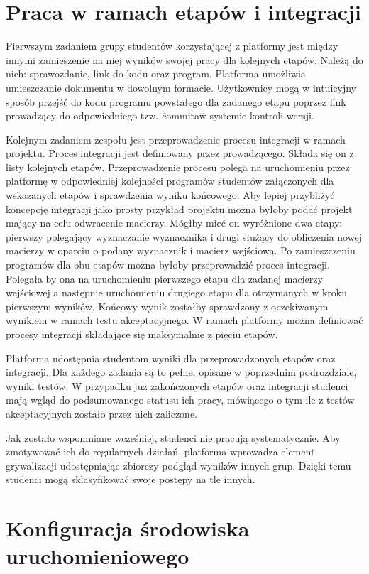 \section{Praca w ramach etapów i integracji}

Pierwszym zadaniem grupy studentów korzystającej z platformy jest między innymi zamieszenie na niej wyników swojej pracy dla kolejnych etapów.
Należą do nich: sprawozdanie, link do kodu oraz program.
Platforma umożliwia umieszczanie dokumentu w dowolnym formacie.
Użytkownicy mogą w intuicyjny sposób przejść do kodu programu powstałego dla zadanego etapu poprzez link prowadzący do odpowiedniego tzw. \"commita\" w systemie kontroli wersji.

Kolejnym zadaniem zespołu jest przeprowadzenie procesu integracji w ramach projektu.
Proces integracji jest definiowany przez prowadzącego.
Składa się on z listy kolejnych etapów.
Przeprowadzenie procesu polega na uruchomieniu przez platformę w odpowiedniej kolejności programów studentów załączonych dla wskazanych etapów i sprawdzenia wyniku końcowego.
Aby lepiej przybliżyć koncepcję integracji jako prosty przykład projektu można byłoby podać projekt mający na celu odwracenie macierzy.
Mógłby mieć on wyróżnione dwa etapy: pierwszy polegający wyznaczanie wyznacznika i drugi służący do obliczenia nowej macierzy w oparciu o podany wyznacznik i macierz wejściową.
Po zamieszczeniu programów dla obu etapów można byłoby przeprowadzić proces integracji.
Polegała by ona na uruchomieniu pierwszego etapu dla zadanej macierzy wejściowej a następnie uruchomieniu drugiego etapu dla otrzymanych w kroku pierwszym wyników.
Końcowy wynik zostałby sprawdzony z oczekiwanym wynikiem w ramach testu akceptacyjnego.
W ramach platformy można definiować procesy integracji składające się maksymalnie z pięciu etapów.

Platforma udostępnia studentom wyniki dla przeprowadzonych etapów oraz integracji.
Dla każdego zadania są to pełne, opisane w poprzednim podrozdziale, wyniki testów.
W przypadku już zakończonych etapów oraz integracji studenci mają wgląd do podsumowanego statusu ich pracy, mówiącego o tym ile z testów akceptacyjnych zostało przez nich zaliczone.

Jak zostało wspomniane wcześniej, studenci nie pracują systematycznie.
Aby zmotywować ich do regularnych działań, platforma wprowadza element grywalizacji udostępniając zbiorczy podgląd wyników innych grup.
Dzięki temu studenci mogą sklasyfikować swoje postępy na tle innych.


\section{Konfiguracja środowiska uruchomieniowego}

